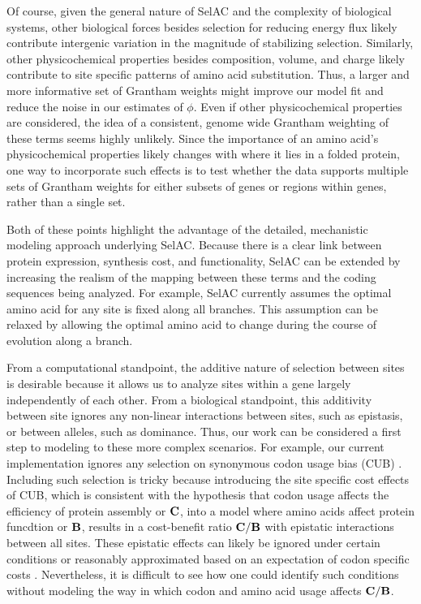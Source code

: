 \documentclass[12pt,letterpaper]{article}
\newcommand{\Cost}{\ensuremath{\text{\textbf{C}}}\xspace}
\newcommand{\Func}{\ensuremath{\text{\textbf{B}}}\xspace}
\newcommand{\selac}{SelAC\xspace}
\begin{document}
Of course, given the general nature of \selac and the complexity of biological systems, other biological forces besides selection for reducing energy flux likely contribute intergenic variation in the magnitude of stabilizing selection.
Similarly, other physicochemical properties besides composition, volume, and charge likely contribute to site specific patterns of amino acid substitution. %
Thus, a larger and more informative set of Grantham weights might improve our model fit and reduce the noise in our estimates of $\phi$.
Even if other physicochemical properties are considered, the idea of a consistent, genome wide Grantham weighting of these terms seems highly unlikely.
Since the importance of an amino acid's physicochemical properties likely changes with where it lies in a folded protein, one way to incorporate such effects is to test whether the data supports multiple sets of Grantham weights for either subsets of genes or regions within genes, rather than a single set.


Both of these points highlight the advantage of the detailed, mechanistic modeling approach underlying \selac.
Because there is a clear link between protein expression, synthesis cost, and functionality, \selac can be extended by increasing the realism of the mapping between these terms and the coding sequences being analyzed.
For example, \selac currently assumes the optimal amino acid for any site is fixed along all branches.
This assumption can be relaxed by allowing the optimal amino acid to change during the course of evolution along a branch.

From a computational standpoint, the additive nature of selection between sites is desirable because it allows us to analyze sites within a gene largely independently of each other.
From a biological standpoint, this additivity between site ignores any non-linear interactions between sites, such as epistasis, or between alleles, such as dominance.
Thus, our work can be considered a first step to modeling to these more complex scenarios.
For example, our current implementation ignores any selection on synonymous codon usage bias (CUB) \citep[c.f.][JEREMY AND BRIAN: DO YOU HAVE ANY OTHER REFERENCES?]{YangAndNielsen2008,PouyetEtAl2016}.
Including such selection is tricky because introducing the site specific cost effects of CUB, which is consistent with the hypothesis that codon usage affects the efficiency of protein assembly or \Cost, into a model where amino acids affect protein funcdtion or \Func, results in a cost-benefit ratio $\Cost/\Func$ with epistatic interactions between all sites.
These epistatic effects can likely be ignored under certain conditions or reasonably approximated based on an expectation of codon specific costs \citep[e.g.][]{KubatkoEtAl2016}.
Nevertheless, it is difficult to see how one could identify such conditions without modeling the way in which codon and amino acid usage affects $\Cost/\Func$.
\end{document}
